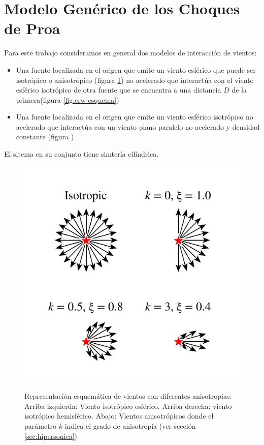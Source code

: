 \section{Modelo Genérico de los Choques de Proa}
\label{sec:Modelo-generico}
Para este trabajo consideramos en general dos modelos de
interacción  de vientos:
\begin{itemize}
\item Una fuente localizada en el origen que emite un viento esférico
  que puede ser isotrópico o anisotrópico (figura
  \ref{fig:isotropic-aniso}) no acelerado que interactúa con el viento
  esférico isotrópico de otra fuente que se encuentra a una distancia
  $D$ de la primera(figura \ref{fig:crw-esquema})
\item Una fuente localizada en el origen que emite un viento esférico
  isotrópico no acelerado que interactúa con un viento plano paralelo
  no acelerado y densidad constante (figura )
\end{itemize}
El sitema en su conjunto tiene simtería cilíndrica.
\begin{figure}
  \includegraphics[width=0.7\linewidth]{./Figures/anisotropic-arrows}
  \label{fig:isotropic-aniso}
  \caption{Representación esquemática de vientos con diferentes
    anisotropías:
    Arriba izquierda: Viento isotrópico esférico. Arriba derecha: viento
    isotrópico hemisférico. Abajo: Vientos anisotrópicos donde el
    parámetro $k$ indica el grado de anisotropía (ver sección
    \ref{sec:hipersonica})}
\end{figure}
